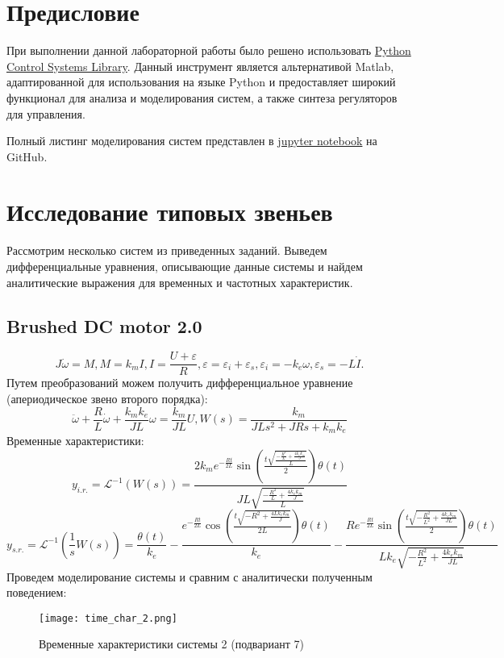 \tableofcontents
\section*{Предисловие}
При выполнении данной лабораторной работы было решено использовать 
\href{https://python-control.readthedocs.io/en/0.9.4/}{Python Control Systems Library}.
Данный инструмент является альтернативой Matlab, адаптированной для использования на 
языке Python и предоставляет широкий функционал для анализа и моделирования систем,
а также синтеза регуляторов для управления.

Полный листинг моделирования систем представлен в \href{https://github.com/diuzhevVlad/control-theory-itmo-fall-2023/blob/main/Lab4/Lab4.ipynb}{jupyter notebook} на GitHub.

\pagebreak

\section{Исследование типовых звеньев}
Рассмотрим несколько систем из приведенных заданий. Выведем дифференциальные уравнения, описывающие данные 
системы и найдем аналитические выражения для временных и частотных характеристик.
\subsection*{Brushed DC motor 2.0}
\begin{equation}
    J \dot{\omega} = M, M = k_m I, I = \frac{U+\varepsilon}{R}, \varepsilon = \varepsilon_i + \varepsilon_s, \varepsilon_i=-k_e \omega, \varepsilon_s=-L\dot{I}.
\end{equation}
Путем преобразований можем получить дифференциальное уравнение (апериодическое звено второго порядка):
\begin{equation*}
    \ddot{\omega} + \frac{R}{L}\dot{\omega}+\frac{k_mk_e}{JL}\omega = \frac{k_m}{JL}U, W(s)=\frac{k_m}{JLs^2 + JRs + k_mk_e}
\end{equation*}
Временные характеристики:
\begin{equation*}
    y_{i.r.}=\mathcal{L}^{-1}(W(s)) = \frac{2 k_{m} e^{- \frac{R t}{2 L}} \sin{(\frac{t \sqrt{\frac{- \frac{R^{2}}{L} + \frac{4 k_{e} k_{m}}{J}}{L}}}{2} )} \theta(t)}{J L \sqrt{\frac{- \frac{R^{2}}{L} + \frac{4 k_{e} k_{m}}{J}}{L}}}
\end{equation*}
\begin{equation*}
    y_{s.r.}=\mathcal{L}^{-1}(\frac{1}{s}W(s)) = \frac{\theta(t)}{k_{e}} - \frac{e^{- \frac{R t}{2 L}} \cos{(\frac{t \sqrt{- R^{2} + \frac{4 L k_{e} k_{m}}{J}}}{2 L} )} \theta(t)}{k_{e}} - \frac{R e^{- \frac{R t}{2 L}} \sin{(\frac{t \sqrt{- \frac{R^{2}}{L^{2}} + \frac{4 k_{e} k_{m}}{J L}}}{2} )} \theta(t)}{L k_{e} \sqrt{- \frac{R^{2}}{L^{2}} + \frac{4 k_{e} k_{m}}{J L}}}
\end{equation*}
Проведем моделирование системы и сравним с аналитически полученным поведением:
\begin{figure}[h]
    \centering
    \texttt{[image: time\_char\_2.png]}
    \caption{\label{fig:The-caption-1}Временные характеристики системы 2 (подвариант 7)}
\end{figure}

